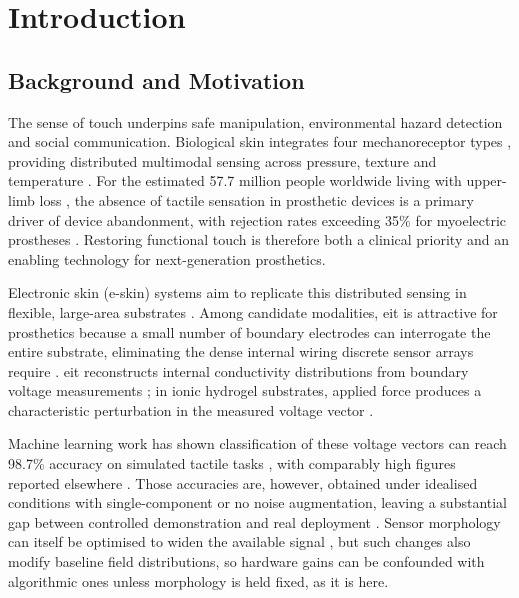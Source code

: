\chapter{Introduction}
\label{ch:introduction}

\section{Background and Motivation}
\label{sec:intro-background}
           
The sense of touch underpins safe manipulation, environmental hazard detection and social communication. Biological skin integrates four mechanoreceptor types \parencite{purves2001mechanoreceptors}, providing distributed multimodal sensing across pressure, texture and temperature \parencite{chortos2016, hammock2013, shih2020}. For the estimated 57.7 million people worldwide living with upper-limb loss \parencite{mcdonald2021}, the absence of tactile sensation in prosthetic devices is a primary driver of device abandonment, with rejection rates exceeding 35\% for myoelectric prostheses \parencite{biddiss2007}. Restoring functional touch is therefore both a clinical priority and an enabling technology for next-generation prosthetics.

Electronic skin (e-skin) systems aim to replicate this distributed sensing in flexible, large-area substrates \parencite{hammock2013, chortos2016, shih2020}. Among candidate modalities, \gls{eit} is attractive for prosthetics because a small number of boundary electrodes can interrogate the entire substrate, eliminating the dense internal wiring discrete sensor arrays require \parencite{silvera-tawil2015, chen2023}. \gls{eit} reconstructs internal conductivity distributions from boundary voltage measurements \parencite{cheney1999, adler2006}; in ionic hydrogel substrates, applied force produces a characteristic perturbation in the measured voltage vector \parencite{costacornella2023, park2022skin}.

Machine learning work has shown classification of these voltage vectors can reach 98.7\% accuracy on simulated tactile tasks \parencite{park2022skin}, with comparably high figures reported elsewhere \parencite{chen2023}. Those accuracies are, however, obtained under idealised conditions with single-component or no noise augmentation, leaving a substantial gap between controlled demonstration and real deployment \parencite{koo2024}. Sensor morphology can itself be optimised to widen the available signal \parencite{dong2025lattice}, but such changes also modify baseline field distributions, so hardware gains can be confounded with algorithmic ones unless morphology is held fixed, as it is here.

